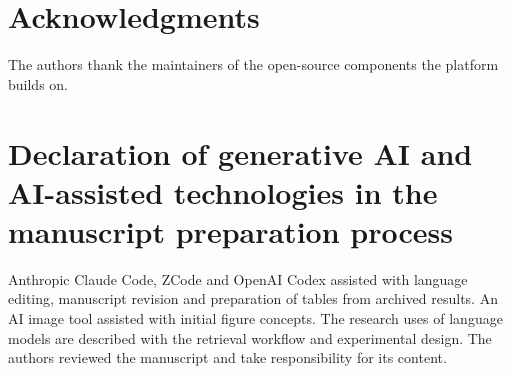 \section*{Acknowledgments}
The authors thank the maintainers of the open-source components the platform
builds on. %

\section*{Declaration of generative AI and AI-assisted technologies in the manuscript preparation process}
Anthropic Claude Code, ZCode and OpenAI Codex assisted with language editing,
manuscript revision and preparation of tables from archived results. An AI
image tool assisted with initial figure concepts. The research uses of
language models are described with the retrieval workflow and experimental
design. The authors reviewed the manuscript and take responsibility for its
content.

